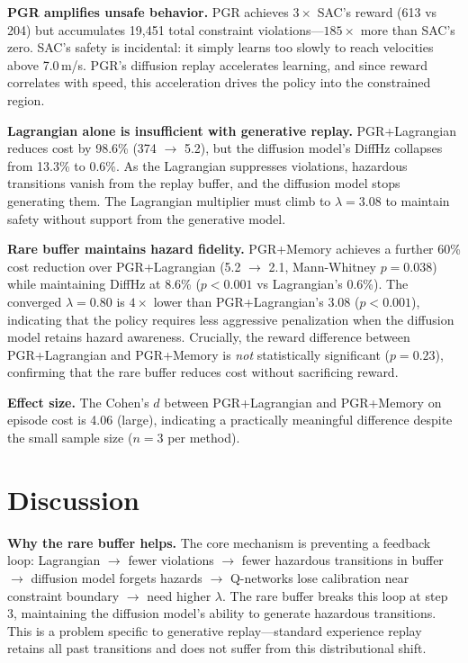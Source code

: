 \documentclass[11pt]{article}
\begin{document}
\textbf{PGR amplifies unsafe behavior.}
PGR achieves $3\times$ SAC's reward (613 vs 204) but accumulates 19{,}451 total constraint violations---$185\times$ more than SAC's zero.
SAC's safety is incidental: it simply learns too slowly to reach velocities above 7.0\,m/s.
PGR's diffusion replay accelerates learning, and since reward correlates with speed, this acceleration drives the policy into the constrained region.

\textbf{Lagrangian alone is insufficient with generative replay.}
PGR+Lagrangian reduces cost by 98.6\% (374 $\to$ 5.2), but the diffusion model's DiffHz collapses from 13.3\% to 0.6\%.
As the Lagrangian suppresses violations, hazardous transitions vanish from the replay buffer, and the diffusion model stops generating them.
The Lagrangian multiplier must climb to $\lambda = 3.08$ to maintain safety without support from the generative model.

\textbf{Rare buffer maintains hazard fidelity.}
PGR+Memory achieves a further 60\% cost reduction over PGR+Lagrangian (5.2 $\to$ 2.1, Mann-Whitney $p{=}0.038$) while maintaining DiffHz at 8.6\% ($p{<}0.001$ vs Lagrangian's 0.6\%).
The converged $\lambda = 0.80$ is $4\times$ lower than PGR+Lagrangian's 3.08 ($p{<}0.001$), indicating that the policy requires less aggressive penalization when the diffusion model retains hazard awareness.
Crucially, the reward difference between PGR+Lagrangian and PGR+Memory is \emph{not} statistically significant ($p{=}0.23$), confirming that the rare buffer reduces cost without sacrificing reward.

\textbf{Effect size.}
The Cohen's $d$ between PGR+Lagrangian and PGR+Memory on episode cost is 4.06 (large), indicating a practically meaningful difference despite the small sample size ($n{=}3$ per method).

\section{Discussion}

\textbf{Why the rare buffer helps.}
The core mechanism is preventing a feedback loop: Lagrangian $\to$ fewer violations $\to$ fewer hazardous transitions in buffer $\to$ diffusion model forgets hazards $\to$ Q-networks lose calibration near constraint boundary $\to$ need higher $\lambda$.
The rare buffer breaks this loop at step 3, maintaining the diffusion model's ability to generate hazardous transitions.
This is a problem specific to generative replay---standard experience replay retains all past transitions and does not suffer from this distributional shift.
\end{document}
